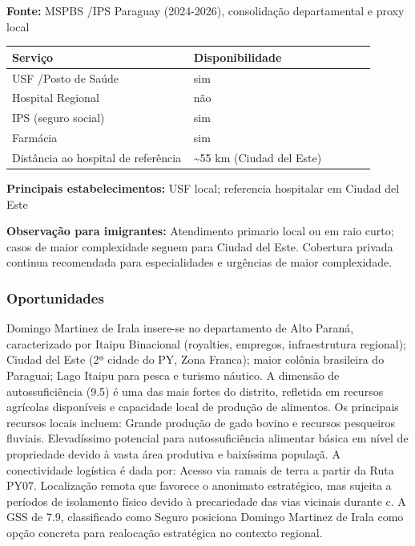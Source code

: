 \textbf{Fonte:} MSPBS /\allowbreak  IPS Paraguay (2024-2026), consolidação
departamental e proxy local

{\def\LTcaptype{none} %
\begin{longtable}{@{}>{\raggedright\arraybackslash}p{0.45\linewidth} >{\raggedright\arraybackslash}p{0.45\linewidth}@{}}
\toprule\noalign{}
Serviço & Disponibilidade \\
\midrule\noalign{}
\endhead
\bottomrule\noalign{}
\endlastfoot
USF /\allowbreak  Posto de Saúde & sim \\
Hospital Regional & não \\
IPS (seguro social) & sim \\
Farmácia & sim \\
Distância ao hospital de referência & \textasciitilde55 km (Ciudad del
Este) \\
\end{longtable}
}

\textbf{Principais estabelecimentos:} USF local; referencia hospitalar
em Ciudad del Este

\textbf{Observação para imigrantes:} Atendimento primario local ou em
raio curto; casos de maior complexidade seguem para Ciudad del Este.
Cobertura privada continua recomendada para especialidades e urgências
de maior complexidade.
\newpage

\subsubsection*{Oportunidades}\label{oport-domingo-martinez-de-irala-1003}
Domingo Martinez de Irala insere-se no departamento de Alto Paraná, caracterizado por Itaipu Binacional (royalties, empregos, infraestrutura regional); Ciudad del Este (2ª cidade do PY, Zona Franca); maior colônia brasileira do Paraguai; Lago Itaipu para pesca e turismo náutico. A dimensão de autossuficiência (9.5) é uma das mais fortes do distrito, refletida em recursos agrícolas disponíveis e capacidade local de produção de alimentos. Os principais recursos locais incluem: Grande produção de gado bovino e recursos pesqueiros fluviais. Elevadíssimo potencial para autossuficiência alimentar básica em nível de propriedade devido à vasta área produtiva e baixíssima populaçã. A conectividade logística é dada por: Acesso via ramais de terra a partir da Ruta PY07. Localização remota que favorece o anonimato estratégico, mas sujeita a períodos de isolamento físico devido à precariedade das vias vicinais durante c. A GSS de 7.9, classificado como Seguro posiciona Domingo Martinez de Irala como opção concreta para realocação estratégica no contexto regional.

